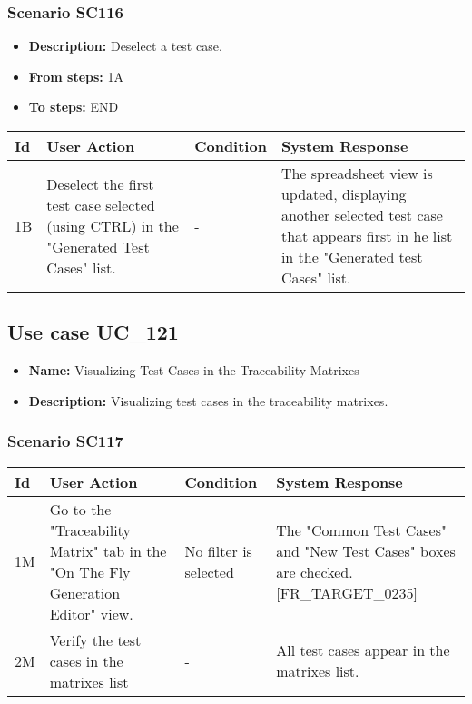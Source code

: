 \documentclass[a4paper,11pt]{article}
\newcommand{\bl}{\\ \hline}
\begin{document}
\subsubsection*{Scenario SC116}
\begin{itemize}
\item {\bf Description:} Deselect a test case.
\item {\bf From steps:} 1A
\item {\bf To steps:} END
\end{itemize}
\begin{tabular}{|p{0.4in}|p{1.5in}|p{1.5in}|p{1.5in}|}
\hline
Id & User Action & Condition & System Response \bl 
1B & Deselect the first test case selected (using CTRL) in the
						"Generated Test Cases" list. & - & The spreadsheet view is updated, displaying another
						selected test case that appears first in he list in the "Generated
						test Cases" list. \bl
\end{tabular}
\subsection*{Use case UC_121}
\begin{itemize}
\item {\bf Name: }Visualizing Test Cases in the Traceability Matrixes
\item {\bf Description: }Visualizing test cases in the traceability matrixes.
			
\end{itemize}
\subsubsection*{Scenario SC117}
\begin{tabular}{|p{0.4in}|p{1.5in}|p{1.5in}|p{1.5in}|}
\hline
Id & User Action & Condition & System Response \bl 
1M & Go to the "Traceability Matrix" tab in the "On The Fly
						Generation Editor" view. & No filter is selected & The "Common Test Cases" and "New Test Cases" boxes are
						checked. [FR_TARGET_0235] \bl
2M & Verify the test cases in the matrixes list & - & All test cases appear in the matrixes list.\bl
\end{tabular}
\end{document}
